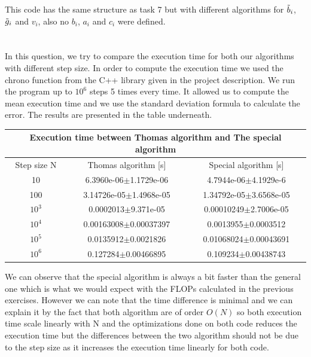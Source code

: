 \documentclass[a4paper,10pt,english]{article}
\begin{document}
This code has the same structure as task 7 but with different algorithms for $\Tilde{b}_i$, $\Tilde{g}_i$ and $v_i$, also no $b_i$, $a_i$ and $c_i$ were defined.

\section{} %

In this question, we try to compare the execution time for both our algorithms with different step size. In order to compute the execution time we used the chrono function from the C++ library given in the project description. We run the program up to $10^6$ steps 5 times every time. It allowed us to compute the mean execution time and we use the standard deviation formula to calculate the error. The results are presented in the table underneath. 


\begin{tabular}{ |c||c|c|}
	\hline
	\multicolumn{3}{|c|}{Execution time between Thomas algorithm and The special algorithm} \\
	\hline
	Step size N & Thomas algorithm [s] &Special algorithm [s] \\
	\hline
	10     &  6.3960e-06$\pm$1.1729e-06   & 4.7944e-06$\pm$4.1929e-6	\\
	100    &  3.14726e-05$\pm$1.4968e-05& 1.34792e-05$\pm$3.6568e-05     \\
	$10^3$ &0.0002013$\pm$9.371e-05		 & 0.00010249$\pm$2.7006e-05\\
	$10^4$ &0.00163008$\pm$0.00037397        & 0.0013955$\pm$0.0003512 \\
	$10^5$ &  0.0135912$\pm$0.0021826      & 0.01068024$\pm$0.00043691 \\
	$10^6$ & 0.127284$\pm$0.00466895      & 0.109234$\pm$0.00438743 \\
	\hline
\end{tabular}

We can observe that the special algorithm is always a bit faster than the general one which is what we would expect with the FLOPs calculated in the previous exercises. However we can note that the time difference is minimal and we can explain it by the fact that both algorithm are of order $O(N)$ so both execution time scale linearly with N and the optimizations done on both code reduces the execution time but the differences between the two algorithm should not be due to the step size as it increases the execution time linearly for both code.
\end{document}
